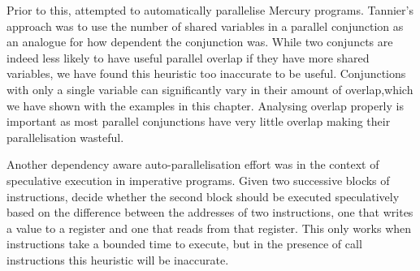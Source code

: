 Prior to this,
\citet*{tannier:2007:parallel_mercury} attempted to automatically parallelise
Mercury programs.
Tannier's approach was to use the number of shared variables in a parallel
conjunction as an analogue for how dependent the conjunction was.
While two conjuncts are indeed less likely
to have useful parallel overlap if they have more shared variables,
we have found this heuristic too inaccurate to be useful.
Conjunctions with only a single variable can significantly vary in
their amount of overlap,which we have shown with the examples in this
chapter.
Analysing overlap properly is important as most parallel conjunctions have
very little overlap making their parallelisation wasteful.

Another dependency aware auto-parallelisation effort
was in the context of speculative execution in imperative programs.
Given two successive blocks of instructions,
\citet*{von_Praun:2007:implicit_parallelism_with_ordered_transactions}
decide whether the second block should be executed speculatively
based on the difference between the addresses of two instructions,
one that writes a value to a register and one that reads from that register.
This only works when instructions take a bounded time to execute,
but in the presence of call instructions
this heuristic will be inaccurate.

